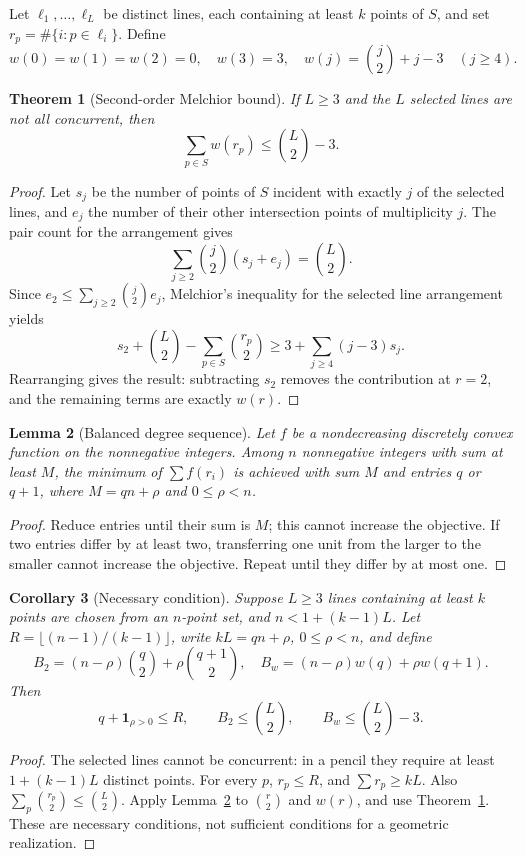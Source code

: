 \documentclass[11pt,a4paper]{amsart}
\newtheorem{theorem}{Theorem}[section]
\newtheorem{lemma}[theorem]{Lemma}
\newtheorem{corollary}[theorem]{Corollary}
\theoremstyle{remark}\newtheorem{remark}[theorem]{Remark}
\begin{document}
Let $\ell_1,\ldots,\ell_L$ be distinct lines, each containing at least $k$ points of $S$, and set $r_p=\#\{i:p\in\ell_i\}$. Define
\[
w(0)=w(1)=w(2)=0,\quad w(3)=3,\quad w(j)=\binom j2+j-3\quad(j\ge4).
\]
\begin{theorem}[Second-order Melchior bound]\label{thm:second}
If $L\ge3$ and the $L$ selected lines are not all concurrent, then
\[
 \sum_{p\in S}w(r_p)\le\binom L2-3.
\]
\end{theorem}
\begin{proof}
Let $s_j$ be the number of points of $S$ incident with exactly $j$ of the selected lines, and $e_j$ the number of their other intersection points of multiplicity $j$. The pair count for the arrangement gives
\[
 \sum_{j\ge2}\binom j2(s_j+e_j)=\binom L2.
\]
Since $e_2\le\sum_{j\ge2}\binom j2 e_j$, Melchior's inequality for the selected line arrangement yields
\[
 s_2+\binom L2-\sum_{p\in S}\binom{r_p}2
 \ge3+\sum_{j\ge4}(j-3)s_j.
\]
Rearranging gives the result: subtracting $s_2$ removes the contribution at $r=2$, and the remaining terms are exactly $w(r)$.
\end{proof}

\begin{lemma}[Balanced degree sequence]\label{lem:balance}
Let $f$ be a nondecreasing discretely convex function on the nonnegative integers. Among $n$ nonnegative integers with sum at least $M$, the minimum of $\sum f(r_i)$ is achieved with sum $M$ and entries $q$ or $q+1$, where $M=qn+\rho$ and $0\le\rho<n$.
\end{lemma}
\begin{proof}
Reduce entries until their sum is $M$; this cannot increase the objective. If two entries differ by at least two, transferring one unit from the larger to the smaller cannot increase the objective. Repeat until they differ by at most one.
\end{proof}
\begin{corollary}[Necessary condition]\label{cor:test}
Suppose $L\ge3$ lines containing at least $k$ points are chosen from an $n$-point set, and $n<1+(k-1)L$. Let $R=\lfloor(n-1)/(k-1)\rfloor$, write $kL=qn+\rho$, $0\le\rho<n$, and define
\[
 B_2=(n-\rho)\binom q2+\rho\binom{q+1}2,\quad
 B_w=(n-\rho)w(q)+\rho w(q+1).
\]
Then
\[
 q+\mathbf 1_{\rho>0}\le R,\qquad B_2\le\binom L2,\qquad B_w\le\binom L2-3.
\]
\end{corollary}
\begin{proof}
The selected lines cannot be concurrent: in a pencil they require at least $1+(k-1)L$ distinct points. For every $p$, $r_p\le R$, and $\sum r_p\ge kL$. Also $\sum_p\binom{r_p}2\le\binom L2$. Apply Lemma~\ref{lem:balance} to $\binom r2$ and $w(r)$, and use Theorem~\ref{thm:second}. These are necessary conditions, not sufficient conditions for a geometric realization.
\end{proof}
\end{document}

